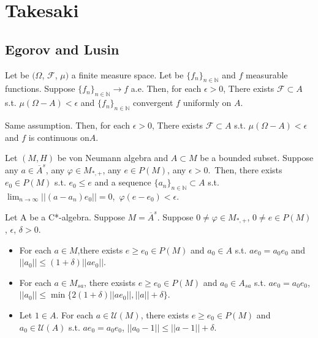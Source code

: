 
\section{Takesaki}
\subsection{Egorov and Lusin}
\begin{theorem}
Let be $(\Omega$, $\mathcal{F}$, $\mu)$ a finite measure space. 
Let be ${\{ f_n \}}_{n \in \mathbb{N}}$ and $f$ measurable functions.
Suppose ${\{ f_n \}}_{n \in \mathbb{N}} \rightarrow f$ a.e. 
Then, for each $\epsilon > 0$, There exists $\mathcal{F} \subset A$ s.t. $\mu (\Omega - A) < \epsilon$ and ${\{ f_n \}}_{n \in \mathbb{N}}$ convergent $f$ uniformly  on $A$.
\end{theorem}

\begin{theorem}
Same assumption.
Then, for each $\epsilon > 0$, There exists $\mathcal{F} \subset A$ s.t. $\mu (\Omega - A) < \epsilon$ and $f$ is continuous on$A$.
\end{theorem}

\begin{theorem}
Let $(M,H)$ be von Neumann algebra and $A \subset M$ be a bounded subset. 
Suppose any $a \in {\overline{A}}^{s}$, any $\varphi \in M_{*,+}$, any $e \in P(M)$, any $\epsilon > 0$.\, 
Then, there exists $e_0 \in P(M)$ s.t. $e_0 \leq e$ and a sequence ${\{ a_n \}}_{n \in \mathbb{N}} \subset A$ s.t. $\lim_{n \to \infty} ||(a-a_n)e_0|| = 0$,\, $\varphi (e-e_0) < \epsilon$.
\end{theorem}

\begin{theorem}
Let A be a C*-algebra. Suppose $M={\overline{A}}^{s}$. 
Suppose $0 \neq \varphi \in M_{*,+}$, $0 \neq e \in P(M)$, $\epsilon$, $\delta > 0$.
\begin{itemize}
\item For each $a \in M$,there exists $e \geq e_0 \in P(M)$ and $a_0 \in A$ s.t. $a e_0=a_0 e_0$ and $||a_0|| \leq (1+\delta)||a e_0||$.
\item For each $a \in M_{sa}$, there exsists $e \geq e_0 \in P(M)$ and $a_0 \in A_{sa}$ s.t. $a e_0=a_0 e_0$,\, $||a_0|| \leq \min \{2(1+\delta)||a e_0||,||a||+\delta \}$.
\item Let $1 \in A$. For each $a \in \mathcal{U}(M)$, there exists $e \geq e_0 \in P(M)$ and $a_0 \in \mathcal{U}(A)$ s.t. $a e_0=a_0 e_0$, $||a_0 - 1|| \leq ||a-1|| + \delta$.
\end{itemize}
\end{theorem}

